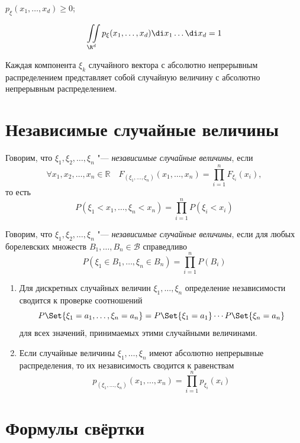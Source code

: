 \begin{props}
\item $ p_\xi(x_1, \dots, x_d) \ge 0 $;
\item
	$$ \iint\limits_{\R^d} p_\xi(x_1, \dots, x_d) \di x_1 \dots \di x_d = 1 $$
\end{props}

\begin{statement}
	Каждая компонента $ \xi_k $ случайного вектора с абсолютно непрерывным распределением
	представляет собой случайную величину с абсолютно непрерывным распределением.
\end{statement}

\section{Независимые случайные величины}

\begin{definition}
	Говорим, что $ \xi_1, \xi_2, \dots, \xi_n $ "--- \emph{независимые случайные величины}, если
	$$ \forall x_1, x_2, \dots, x_n \in \mathbb R \quad F_{(\xi_1, \dots, \xi_n)}(x_1, \dots, x_n) =
	\prod_{i = 1}^n F_{\xi_i}(x_i), $$
	то есть
	$$ P(\xi_1 < x_1, \dots, \xi_n < x_n) = \prod_{i = 1}^n P(\xi_i < x_i) $$
\end{definition}

\begin{definition}
	Говорим, что $ \xi_1, \xi_2, \dots, \xi_n $ "--- \emph{независимые случайные величины}, если для
	любых борелевских множеств $ B_1, \dots, B_n \in \mathcal B $ справедливо
	$$ P(\xi_1 \in B_1, \dots, \xi_n \in B_n) = \prod_{i = 1}^n P(B_i) $$
\end{definition}

\begin{enumerate}
	\item Для дискретных случайных величин $ \xi_1, \dots, \xi_n $ определение независимости
		сводится к проверке соотношений
		$$ P\Set{\xi_1 = a_1, \dots, \xi_n = a_n} = P\Set{\xi_1 = a_1} \cdots P\Set{\xi_n = a_n} $$
		для всех значений, принимаемых этими случайными величинами.
	\item Если случайные величины $ \xi_1, \dots, \xi_n $ имеют абсолютно непрерывные распределения,
		то их независимость сводится к равенствам
		$$ p_{(\xi_1, \dots, \xi_n)}(x_1, \dots, x_n) = \prod_{i = 1}^n p_{\xi_i}(x_i) $$
\end{enumerate}

\section{Формулы свёртки}

